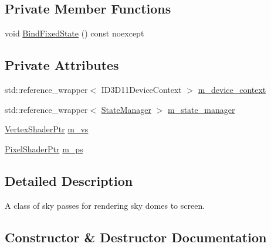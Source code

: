 \subsection*{Private Member Functions}
\begin{DoxyCompactItemize}
\item 
void \hyperlink{classmage_1_1rendering_1_1_sky_pass_ab2e7bf506b3a038264579aa3c494f14d}{Bind\+Fixed\+State} () const noexcept
\end{DoxyCompactItemize}
\subsection*{Private Attributes}
\begin{DoxyCompactItemize}
\item 
std\+::reference\+\_\+wrapper$<$ I\+D3\+D11\+Device\+Context $>$ \hyperlink{classmage_1_1rendering_1_1_sky_pass_a5639f9eb6bf863074c5e5afba2f0e2f5}{m\+\_\+device\+\_\+context}
\item 
std\+::reference\+\_\+wrapper$<$ \hyperlink{classmage_1_1rendering_1_1_state_manager}{State\+Manager} $>$ \hyperlink{classmage_1_1rendering_1_1_sky_pass_aed4f451eb046158e856fdda6de9856f5}{m\+\_\+state\+\_\+manager}
\item 
\hyperlink{namespacemage_1_1rendering_aaf704b9c54a4181f4950a1761de69dda}{Vertex\+Shader\+Ptr} \hyperlink{classmage_1_1rendering_1_1_sky_pass_a935019dff57aaf9ae91f974ec59f11ee}{m\+\_\+vs}
\item 
\hyperlink{namespacemage_1_1rendering_af03d922b228ee9c8542baaa2ecc9f259}{Pixel\+Shader\+Ptr} \hyperlink{classmage_1_1rendering_1_1_sky_pass_a945613544f942b4278454a89bb5e1513}{m\+\_\+ps}
\end{DoxyCompactItemize}


\subsection{Detailed Description}
A class of sky passes for rendering sky domes to screen. 

\subsection{Constructor \& Destructor Documentation}
\hypertarget{classmage_1_1rendering_1_1_sky_pass_a55e8ef167a1e70a88a4be1fd11aed70e}{}\label{classmage_1_1rendering_1_1_sky_pass_a55e8ef167a1e70a88a4be1fd11aed70e} 
